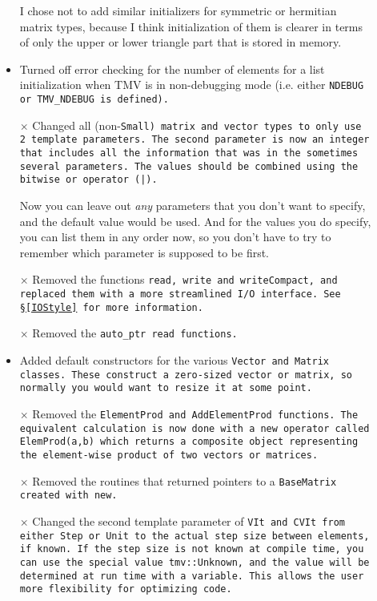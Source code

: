\begin{description}
\begin{itemize}
I chose not to add similar initializers for symmetric or hermitian matrix types, because I think initialization of them is clearer in terms of only the upper or lower triangle part that is stored in memory.  

\item
Turned off error checking for the number of elements for a list 
initialization when TMV is in non-debugging mode (i.e. either \tt{NDEBUG}
or \tt{TMV\_NDEBUG} is defined).

\item[$\times$]
Changed all (non-\tt{Small}) matrix and vector types to only use 2 template
parameters.  The second parameter is now an integer that includes all
the information that was in the sometimes several parameters.  The 
values should be combined using the bitwise or operator (\tt{|}).  

Now you can leave out {\em any} parameters that you don't want to specify,
and the default value would be used.  And for the values you do specify, you can list them in any order now,
so you don't have to try to remember which parameter is supposed to be first.  
 
\item[$\times$]
Removed the functions \tt{read}, \tt{write} and \tt{writeCompact}, and replaced them with a more streamlined I/O interface.  See \S\ref{IOStyle} for more information.

\item[$\times$]
Removed the \tt{auto_ptr} read functions.  

\item
Added default constructors for the various \tt{Vector} and \tt{Matrix} classes.  These construct a zero-sized vector or matrix, so normally you would want to resize it at some point.  

\item[$\times$] Removed the \tt{ElementProd} and \tt{AddElementProd} functions.  The equivalent calculation is now done with a new operator called \tt{ElemProd(a,b)} which returns a composite object representing the element-wise product of two vectors or matrices. 

\item[$\times$] 
Removed the routines that returned pointers to a \tt{BaseMatrix} created with \tt{new}.  

\item[$\times$]
Changed the second template parameter of \tt{VIt} and \tt{CVIt} from either \tt{Step} or \tt{Unit} to the actual step size between elements, if known.  If the step size is not known at compile time, you can use the special value \tt{tmv::Unknown}, and the value will be determined at run time with a variable.  This allows the user more flexibility for optimizing code.  


\end{itemize}
\end{description}
